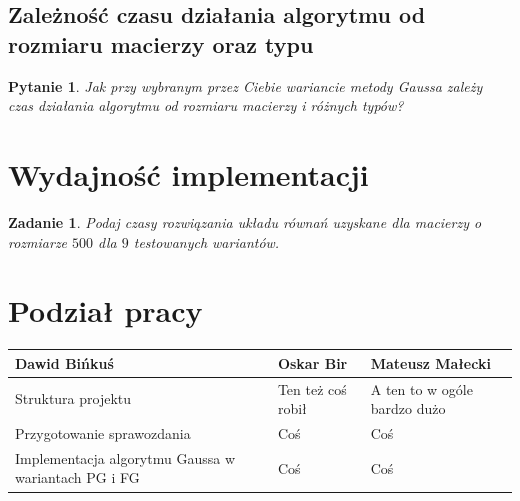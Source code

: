 \documentclass[10pt]{article}
\newtheorem{que}{Pytanie}
\newtheorem{wyd}{Zadanie}
\begin{document}
\subsection{Zależność czasu działania algorytmu od rozmiaru macierzy oraz typu}
\begin{que}
	 Jak przy wybranym przez Ciebie wariancie metody Gaussa zależy czas działania
	algorytmu od rozmiaru macierzy i różnych typów?\label{que:2}
\end{que}
\section{Wydajność implementacji}
\begin{wyd}
	Podaj czasy rozwiązania układu równań uzyskane dla macierzy o rozmiarze $500$ dla $9$ testowanych wariantów.
\end{wyd}
\section{Podział pracy}
\begin{center}
	\begin{tabular}{| l | l | l |}
		\hline
		\textbf{Dawid Bińkuś} & \textbf{Oskar Bir} & \textbf{Mateusz Małecki} \\ \hline
		Struktura projektu & Ten też coś robił & A ten to w ogóle bardzo dużo \\ \hline
		Przygotowanie sprawozdania & Coś & Coś\\ \hline
		Implementacja algorytmu Gaussa w wariantach PG i FG & Coś & Coś \\ \hline
		
		
	\end{tabular}
\end{center}
\end{document}
